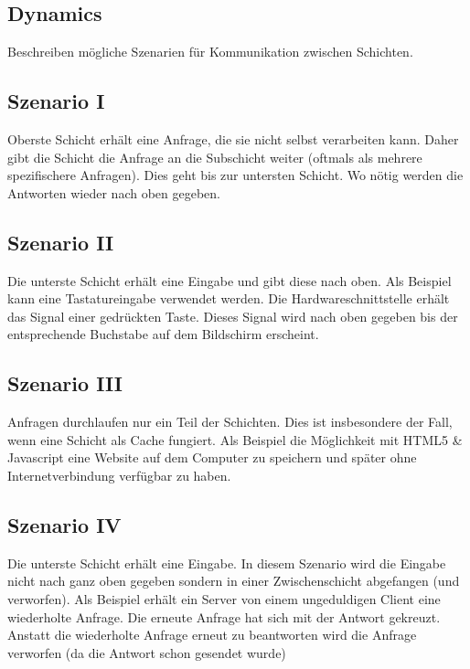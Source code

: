 \subsection*{Dynamics}


Beschreiben mögliche Szenarien für Kommunikation zwischen Schichten.

\subsection*{Szenario I}

Oberste Schicht erhält eine Anfrage, die sie nicht selbst verarbeiten kann. Daher gibt die Schicht die Anfrage an die Subschicht weiter (oftmals als mehrere spezifischere Anfragen). Dies geht bis zur untersten Schicht. Wo nötig werden die Antworten wieder nach oben gegeben.

\subsection*{Szenario II}

Die unterste Schicht erhält eine Eingabe und gibt diese nach oben. Als Beispiel kann eine Tastatureingabe verwendet werden. Die Hardwareschnittstelle erhält das Signal einer gedrückten Taste. Dieses Signal wird nach oben gegeben bis der entsprechende Buchstabe auf dem Bildschirm erscheint.

\subsection*{Szenario III}

Anfragen durchlaufen nur ein Teil der Schichten. Dies ist insbesondere der Fall, wenn eine Schicht als Cache fungiert. Als Beispiel die Möglichkeit mit HTML5 \& Javascript eine Website auf dem Computer zu speichern und später ohne Internetverbindung verfügbar zu haben.

\subsection*{Szenario IV}

Die unterste Schicht erhält eine Eingabe. In diesem Szenario wird die Eingabe nicht nach ganz oben gegeben sondern in einer Zwischenschicht abgefangen (und verworfen). Als Beispiel erhält ein Server von einem ungeduldigen Client eine wiederholte Anfrage. Die erneute Anfrage hat sich mit der Antwort gekreuzt. Anstatt die wiederholte Anfrage erneut zu beantworten wird die Anfrage verworfen (da die Antwort schon gesendet wurde)

